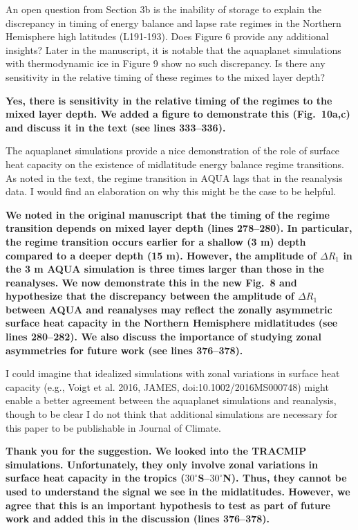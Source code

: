 \documentclass{article}
\begin{document}
An open question from Section 3b is the inability of storage to explain the discrepancy in timing of energy balance and lapse rate regimes in the Northern Hemisphere high latitudes (L191-193). Does Figure 6 provide any additional insights? Later in the manuscript, it is notable that the aquaplanet simulations with thermodynamic ice in Figure 9 show no such discrepancy. Is there any sensitivity in the relative timing of these regimes to the mixed layer depth?

\textbf{Yes, there is sensitivity in the relative timing of the regimes to the mixed layer depth. We added a figure to demonstrate this (Fig.~10a,c) and discuss it in the text (see lines 333--336).}

The aquaplanet simulations provide a nice demonstration of the role of surface heat capacity on the existence of midlatitude energy balance regime transitions. As noted in the text, the regime transition in AQUA lags that in the reanalysis data. I would find an elaboration on why this might be the case to be helpful.

\textbf{We noted in the original manuscript that the timing of the regime transition depends on mixed layer depth (lines 278--280). In particular, the regime transition occurs earlier for a shallow (3 m) depth compared to a deeper depth (15 m). However, the amplitude of $\Delta R_1$ in the 3 m AQUA simulation is three times larger than those in the reanalyses. We now demonstrate this in the new Fig.~8 and hypothesize that the discrepancy between the amplitude of $\Delta R_1$ between AQUA and reanalyses may reflect the zonally asymmetric surface heat capacity in the Northern Hemisphere midlatitudes (see lines 280--282). We also discuss the importance of studying zonal asymmetries for future work (see lines 376--378).}

I could imagine that idealized simulations with zonal variations in surface heat capacity (e.g., Voigt et al. 2016, JAMES, doi:10.1002/2016MS000748) might enable a better agreement between the aquaplanet simulations and reanalysis, though to be clear I do not think that additional simulations are necessary for this paper to be publishable in Journal of Climate.

\textbf{Thank you for the suggestion. We looked into the TRACMIP simulations. Unfortunately, they only involve zonal variations in surface heat capacity in the tropics ($30^\circ$S--$30^\circ$N). Thus, they cannot be used to understand the signal we see in the midlatitudes. However, we agree that this is an important hypothesis to test as part of future work and added this in the discussion (lines 376--378).}
\end{document}
